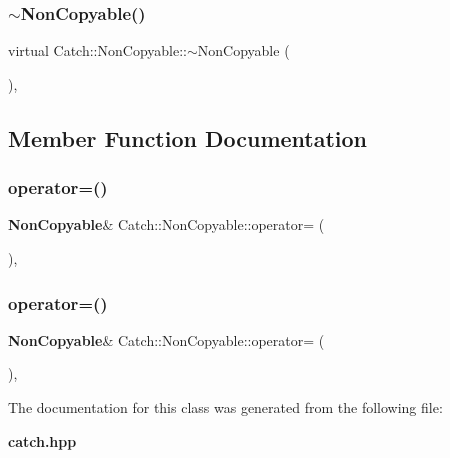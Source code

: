 \mbox{\label{class_catch_1_1_non_copyable_a81254677280fef337eb4a676e91e3293}} 
\subsubsection{$\sim$NonCopyable()}
{\footnotesize\ttfamily virtual Catch\+::\+Non\+Copyable\+::$\sim$\+Non\+Copyable (\begin{DoxyParamCaption}{ }\end{DoxyParamCaption})\hspace{0.3cm}{\ttfamily [protected]}, {\ttfamily [virtual]}}



\subsection{Member Function Documentation}
\mbox{\label{class_catch_1_1_non_copyable_a958b5f57d45fdd6f418bec8b46a629ab}} 
\subsubsection{operator=()\hspace{0.1cm}{\footnotesize\ttfamily [1/2]}}
{\footnotesize\ttfamily \textbf{ Non\+Copyable}\& Catch\+::\+Non\+Copyable\+::operator= (\begin{DoxyParamCaption}\item[{\textbf{ Non\+Copyable} const \&}]{ }\end{DoxyParamCaption})\hspace{0.3cm}{\ttfamily [private]}, {\ttfamily [delete]}}

\mbox{\label{class_catch_1_1_non_copyable_a317697b6d3c4cda093666ce61d3a1e31}} 
\subsubsection{operator=()\hspace{0.1cm}{\footnotesize\ttfamily [2/2]}}
{\footnotesize\ttfamily \textbf{ Non\+Copyable}\& Catch\+::\+Non\+Copyable\+::operator= (\begin{DoxyParamCaption}\item[{\textbf{ Non\+Copyable} \&\&}]{ }\end{DoxyParamCaption})\hspace{0.3cm}{\ttfamily [private]}, {\ttfamily [delete]}}



The documentation for this class was generated from the following file\+:\begin{DoxyCompactItemize}
\item 
\textbf{ catch.\+hpp}\end{DoxyCompactItemize}
